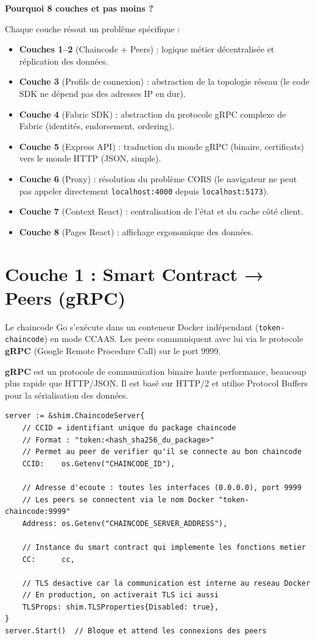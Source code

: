 \documentclass[12pt,a4paper,twoside]{report}
\begin{document}
\begin{infobox}
\textbf{Pourquoi 8 couches et pas moins ?}

Chaque couche résout un problème spécifique :
\begin{itemize}
    \item \textbf{Couches 1--2} (Chaincode + Peers) : logique métier décentralisée et réplication des données.
    \item \textbf{Couche 3} (Profils de connexion) : abstraction de la topologie réseau (le code SDK ne dépend pas des adresses IP en dur).
    \item \textbf{Couche 4} (Fabric SDK) : abstraction du protocole gRPC complexe de Fabric (identités, endorsement, ordering).
    \item \textbf{Couche 5} (Express API) : traduction du monde gRPC (binaire, certificats) vers le monde HTTP (JSON, simple).
    \item \textbf{Couche 6} (Proxy) : résolution du problème CORS (le navigateur ne peut pas appeler directement \texttt{localhost:4000} depuis \texttt{localhost:5173}).
    \item \textbf{Couche 7} (Context React) : centralisation de l'état et du cache côté client.
    \item \textbf{Couche 8} (Pages React) : affichage ergonomique des données.
\end{itemize}
\end{infobox}

\section{Couche 1 : Smart Contract → Peers (gRPC)}

Le chaincode Go s'exécute dans un conteneur Docker indépendant (\texttt{token-chaincode}) en mode CCAAS. Les peers communiquent avec lui via le protocole \textbf{gRPC} (Google Remote Procedure Call) sur le port 9999.

\textbf{gRPC} est un protocole de communication binaire haute performance, beaucoup plus rapide que HTTP/JSON. Il est basé sur HTTP/2 et utilise Protocol Buffers pour la sérialisation des données.

\begin{lstlisting}[language=golang, caption=Le chaincode écoute en tant que serveur gRPC]
server := &shim.ChaincodeServer{
    // CCID = identifiant unique du package chaincode
    // Format : "token:<hash_sha256_du_package>"
    // Permet au peer de verifier qu'il se connecte au bon chaincode
    CCID:    os.Getenv("CHAINCODE_ID"),
    
    // Adresse d'ecoute : toutes les interfaces (0.0.0.0), port 9999
    // Les peers se connectent via le nom Docker "token-chaincode:9999"
    Address: os.Getenv("CHAINCODE_SERVER_ADDRESS"),
    
    // Instance du smart contract qui implemente les fonctions metier
    CC:      cc,
    
    // TLS desactive car la communication est interne au reseau Docker
    // En production, on activerait TLS ici aussi
    TLSProps: shim.TLSProperties{Disabled: true},
}
server.Start()  // Bloque et attend les connexions des peers
\end{lstlisting}
\end{document}
